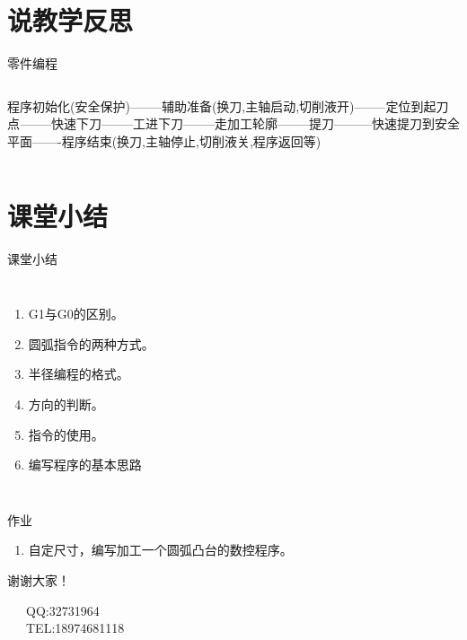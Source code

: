\documentclass[UTF8,zihao=-4,handout,smaller,aspectratio=1610]{ctexbeamer}
\begin{document}
\section{说教学反思}
\begin{frame}{零件编程}
    \begin{columns}
        \column{\textwidth}
 程序初始化(安全保护)--------辅助准备(换刀,主轴启动,切削液开)--------定位到起刀点--------快速下刀--------工进下刀--------走加工轮廓--------提刀---------快速提刀到安全平面-------程序结束(换刀,主轴停止,切削液关,程序返回等)       
        
    \end{columns}
\end{frame}



\section*{课堂小结}
\begin{frame}{课堂小结}

    \begin{columns}
\begin{enumerate}[<+-> ]
\item G1与G0的区别。
\item 圆弧指令的两种方式。
\item 半径编程的格式。
\item 方向的判断。
\item 指令的使用。
\item 编写程序的基本思路
\end{enumerate}
    \end{columns}
\end{frame}

\begin{frame}{作业}
\begin{enumerate}
    \item 自定尺寸，编写加工一个圆弧凸台的数控程序。
\end{enumerate}
\end{frame}

\begin{frame}[plain]
\vfill

\centering \huge 谢谢大家！

\vfill

\flushleft \footnotesize   
~~~QQ:32731964\\
~~~TEL:18974681118\\

\end{frame}
\end{document}
